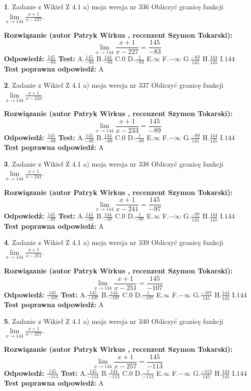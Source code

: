 \documentclass[12pt, a4paper]{article}
\theoremstyle{definition} %
\newtheorem{zad}{}
\newcommand{\zadStart}[1]{\begin{zad}#1\newline}
\newcommand{\zadStop}{\end{zad}}
\newcommand{\rozwStart}[2]{\noindent \textbf{Rozwiązanie (autor #1 , recenzent #2): }\newline}
\newcommand{\rozwStop}{\newline}
\newcommand{\odpStart}{\noindent \textbf{Odpowiedź:}\newline}
\newcommand{\odpStop}{\newline}
\newcommand{\testStart}{\noindent \textbf{Test:}\newline}
\newcommand{\testStop}{\newline}
\newcommand{\kluczStart}{\noindent \textbf{Test poprawna odpowiedź:}\newline}
\newcommand{\kluczStop}{\newline}
\begin{document}
\zadStart{Zadanie z Wikieł Z 4.1 a) moja wersja nr 336}
Obliczyć granicę funkcji $\lim\limits_{x\to144}\frac{x+1}{x-227}$.
\zadStop
\rozwStart{Patryk Wirkus}{Szymon Tokarski}
$$\lim\limits_{x\to144}\frac{x+1}{x-227} = \frac{145}{-83}$$
\rozwStop
\odpStart
$\frac{145}{-83}$
\odpStop
\testStart
A.$\frac{145}{-83}$
B.$\frac{144}{-83}$
C.$0$
D.$\frac{1}{-83}$
E.$\infty$
F.$-\infty$
G.$\frac{-83}{145}$
H.$\frac{144}{145}$
I.$144$
\testStop
\kluczStart
A
\kluczStop



\zadStart{Zadanie z Wikieł Z 4.1 a) moja wersja nr 337}
Obliczyć granicę funkcji $\lim\limits_{x\to144}\frac{x+1}{x-233}$.
\zadStop
\rozwStart{Patryk Wirkus}{Szymon Tokarski}
$$\lim\limits_{x\to144}\frac{x+1}{x-233} = \frac{145}{-89}$$
\rozwStop
\odpStart
$\frac{145}{-89}$
\odpStop
\testStart
A.$\frac{145}{-89}$
B.$\frac{144}{-89}$
C.$0$
D.$\frac{1}{-89}$
E.$\infty$
F.$-\infty$
G.$\frac{-89}{145}$
H.$\frac{144}{145}$
I.$144$
\testStop
\kluczStart
A
\kluczStop



\zadStart{Zadanie z Wikieł Z 4.1 a) moja wersja nr 338}
Obliczyć granicę funkcji $\lim\limits_{x\to144}\frac{x+1}{x-241}$.
\zadStop
\rozwStart{Patryk Wirkus}{Szymon Tokarski}
$$\lim\limits_{x\to144}\frac{x+1}{x-241} = \frac{145}{-97}$$
\rozwStop
\odpStart
$\frac{145}{-97}$
\odpStop
\testStart
A.$\frac{145}{-97}$
B.$\frac{144}{-97}$
C.$0$
D.$\frac{1}{-97}$
E.$\infty$
F.$-\infty$
G.$\frac{-97}{145}$
H.$\frac{144}{145}$
I.$144$
\testStop
\kluczStart
A
\kluczStop



\zadStart{Zadanie z Wikieł Z 4.1 a) moja wersja nr 339}
Obliczyć granicę funkcji $\lim\limits_{x\to144}\frac{x+1}{x-251}$.
\zadStop
\rozwStart{Patryk Wirkus}{Szymon Tokarski}
$$\lim\limits_{x\to144}\frac{x+1}{x-251} = \frac{145}{-107}$$
\rozwStop
\odpStart
$\frac{145}{-107}$
\odpStop
\testStart
A.$\frac{145}{-107}$
B.$\frac{144}{-107}$
C.$0$
D.$\frac{1}{-107}$
E.$\infty$
F.$-\infty$
G.$\frac{-107}{145}$
H.$\frac{144}{145}$
I.$144$
\testStop
\kluczStart
A
\kluczStop



\zadStart{Zadanie z Wikieł Z 4.1 a) moja wersja nr 340}
Obliczyć granicę funkcji $\lim\limits_{x\to144}\frac{x+1}{x-257}$.
\zadStop
\rozwStart{Patryk Wirkus}{Szymon Tokarski}
$$\lim\limits_{x\to144}\frac{x+1}{x-257} = \frac{145}{-113}$$
\rozwStop
\odpStart
$\frac{145}{-113}$
\odpStop
\testStart
A.$\frac{145}{-113}$
B.$\frac{144}{-113}$
C.$0$
D.$\frac{1}{-113}$
E.$\infty$
F.$-\infty$
G.$\frac{-113}{145}$
H.$\frac{144}{145}$
I.$144$
\testStop
\kluczStart
A
\kluczStop
\end{document}
